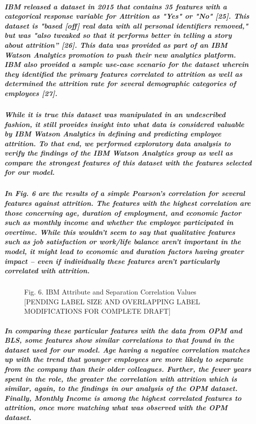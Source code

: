 \documentclass{article}
\begin{document}
\subparagraph{IBM released a dataset in 2015 that contains 35 features with a categorical response variable for Attrition as "Yes" or "No" [25]. This dataset is "based [off] real data with all personal identifiers removed," but was "also tweaked so that it performs better in telling a story about attrition” [26]. This data was provided as part of an IBM Watson Analytics promotion to push their new analytics platform. IBM also provided a sample use-case scenario for the dataset wherein they identified the primary features correlated to attrition as well as determined the attrition rate for several demographic categories of employees [27].}

\subparagraph{While it is true this dataset was manipulated in an undescribed fashion, it still provides insight into what data is considered valuable by IBM Watson Analytics in defining and predicting employee attrition. To that end, we performed exploratory data analysis to verify the findings of the IBM Watson Analytics group as well as compare the strongest features of this dataset with the features selected for our model.}

\subparagraph{In Fig. 6 are the results of a simple Pearson's correlation for several features against attrition. The features with the highest correlation are those concerning age, duration of employment, and economic factor such as monthly income and whether the employee participated in overtime. While this wouldn't seem to say that qualitative features such as job satisfaction or work/life balance aren't important in the model, it might lead to economic and duration factors having greater impact – even if individually these features aren't particularly correlated with attrition.}

\begin{figure}
\caption{Fig. 6. IBM Attribute and Separation Correlation Values [PENDING LABEL SIZE AND OVERLAPPING LABEL MODIFICATIONS FOR COMPLETE DRAFT]}
\end{figure}
 
\subparagraph{In comparing these particular features with the data from OPM and BLS, some features show similar correlations to that found in the dataset used for our model. Age having a negative correlation matches up with the trend that younger employees are more likely to separate from the company than their older colleagues. Further, the fewer years spent in the role, the greater the correlation with attrition which is similar, again, to the findings in our analysis of the OPM dataset. Finally, Monthly Income is among the highest correlated features to attrition, once more matching what was observed with the OPM dataset.}
 
\end{document}
